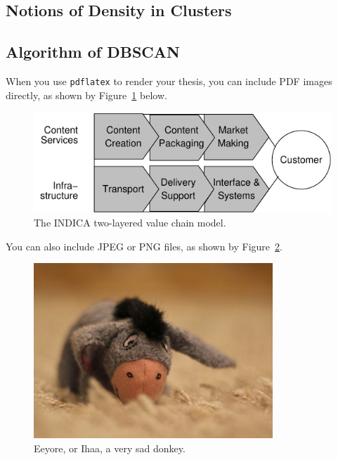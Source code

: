 \subsection{Notions of Density in Clusters}
\label{subsec:DBSCANnotion}


\subsection{Algorithm of DBSCAN}
\label{subsec:DBSCANalgorithm}


When you use \texttt{pdflatex} to render your thesis, you can include PDF images
directly, as shown by Figure~\ref{fig:indica_model} below.

\begin{figure}[ht]
  \begin{center}
    \includegraphics[width=\textwidth]{images/indica_model.pdf}
    \caption{The INDICA two-layered value chain model.}
    \label{fig:indica_model}
  \end{center}
\end{figure}

You can also include JPEG or PNG files, as shown by Figure~\ref{fig:eeyore}.

\begin{figure}[ht]
  \begin{center}
    \includegraphics[width=9cm]{images/ihaa.jpg}
    \caption{Eeyore, or Ihaa, a very sad donkey.}
    \label{fig:eeyore}
  \end{center}
\end{figure}

